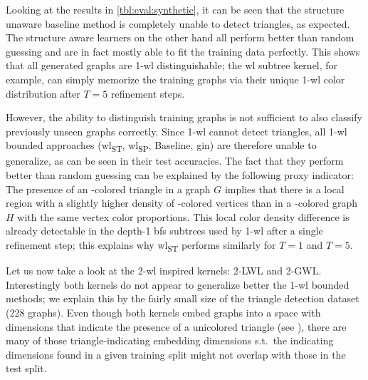 Looking at the results in \cref{tbl:eval:synthetic}, it can be seen that the structure unaware baseline method is completely unable to detect triangles, as expected.
The structure aware learners on the other hand all perform better than random guessing and are in fact mostly able to fit the training data perfectly.
This shows that all generated graphs are 1-\acs{wl} distinguishable; the \ac{wl} subtree kernel, for example, can simply memorize the training graphs via their unique 1-\acs{wl} color distribution after $T = 5$ refinement steps.

However, the ability to distinguish training graphs is not sufficient to also classify previously unseen graphs correctly.
Since 1-\acs{wl} cannot detect triangles, all 1-\acs{wl} bounded approaches (\acs{wl}\textsubscript{ST}, \acs{wl}\textsubscript{SP}, Baseline, \acs{gin}) are therefore unable to generalize, as can be seen in their test accuracies.
The fact that they perform better than random guessing can be explained by the following proxy indicator:
The presence of an -colored triangle in a graph $G$ implies that there is a local region with a slightly higher density of -colored vertices than in a -colored graph $H$ with the same vertex color proportions.
This local color density difference is already detectable in the depth-1 \acs{bfs} subtrees used by 1-\acs{wl} after a single refinement step; this explains why \acs{wl}\textsubscript{ST} performs similarly for $T = 1$ and $T = 5$.

Let us now take a look at the 2-\acs{wl} inspired kernels: 2-LWL and 2-GWL.\@
Interestingly both kernels do not appear to generalize better the 1-\acs{wl} bounded methods;
we explain this by the fairly small size of the triangle detection dataset (228 graphs).
Even though both kernels embed graphs into a space with dimensions that indicate the presence of a unicolored triangle (see ), there are many of those triangle-indicating embedding dimensions s.t.\ the indicating dimensions found in a given training split might not overlap with those in the test split.

